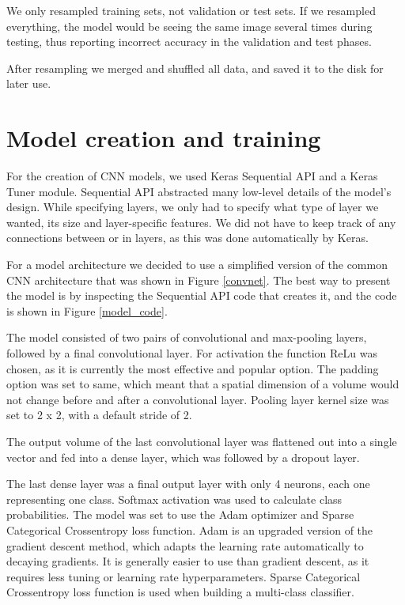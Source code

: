 We only resampled training sets, not validation or test sets.
If we resampled everything, the model would be seeing the same image several times during testing, thus reporting incorrect accuracy in the validation and test phases.

After resampling we merged and shuffled all data, and saved it to the disk for later use.

\newpage
\section{ Model creation and training}\label{cnn_ref}

For the creation of CNN models, we used Keras Sequential API and a Keras Tuner module.
Sequential API abstracted many low-level details of the model's design.
While specifying layers, we only had to specify what type of layer we wanted, its size and layer-specific features. 
We did not have to keep track of any connections between or in layers, as this was done automatically by Keras.

For a model architecture we decided to use a simplified version of the common CNN architecture that was shown in Figure \ref{convnet}.
The best way to present the model is by inspecting the Sequential API code that creates it, and the code is shown in Figure \ref{model_code}.

The model consisted of two pairs of convolutional and max-pooling layers, followed by a final convolutional layer.
For activation the function ReLu was chosen, as it is currently the most effective and popular option\cite{cs231n}\cite{geron}.
The padding option was set to same, which meant that a spatial dimension of a volume would not change before and after a convolutional layer.
Pooling layer kernel size was set to 2 x 2, with a default stride of 2.

The output volume of the last convolutional layer was flattened out into a single vector and fed into a dense layer, which was followed by a dropout layer\footnotemark.


The last dense layer was a final output layer with only 4 neurons, each one representing one class.
Softmax activation was used to calculate class probabilities.
The model was set to use the Adam optimizer and Sparse Categorical Crossentropy loss function.
Adam is an upgraded version of the gradient descent method, which adapts the learning rate automatically to decaying gradients\cite{geron}.
It is generally easier to use than gradient descent, as it requires less tuning or learning rate hyperparameters.
Sparse Categorical Crossentropy loss function is used when building a multi-class classifier.

